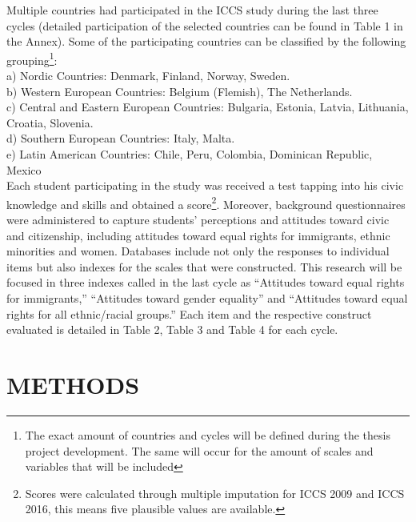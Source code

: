 \documentclass[
      11pt,
                      ]{article}
\begin{document}
Multiple countries had participated in the ICCS study during the last
three cycles (detailed participation of the selected countries can be
found in Table 1 in the Annex). Some of the participating countries can
be classified by the following grouping\footnote{The exact amount of
  countries and cycles will be defined during the thesis project
  development. The same will occur for the amount of scales and
  variables that will be included}:\\
\newline  a) Nordic Countries: Denmark, Finland, Norway, Sweden.\\
b) Western European Countries: Belgium (Flemish), The Netherlands.\\
c) Central and Eastern European Countries: Bulgaria, Estonia, Latvia,
Lithuania, Croatia, Slovenia.\\
d) Southern European Countries: Italy, Malta.\\
e) Latin American Countries: Chile, Peru, Colombia, Dominican Republic,
Mexico\\
\newline  Each student participating in the study was received a test
tapping into his civic knowledge and skills and obtained a
score\footnote{Scores were calculated through multiple imputation for
  ICCS 2009 and ICCS 2016, this means five plausible values are
  available.}. Moreover, background questionnaires were administered to
capture students' perceptions and attitudes toward civic and
citizenship, including attitudes toward equal rights for immigrants,
ethnic minorities and women. Databases include not only the responses to
individual items but also indexes for the scales that were constructed.
This research will be focused in three indexes called in the last cycle
as ``Attitudes toward equal rights for immigrants,'' ``Attitudes toward
gender equality'' and ``Attitudes toward equal rights for all
ethnic/racial groups.'' Each item and the respective construct evaluated
is detailed in Table 2, Table 3 and Table 4 for each cycle.

\hypertarget{methods}{%
\section{METHODS}\label{methods}}
\end{document}
